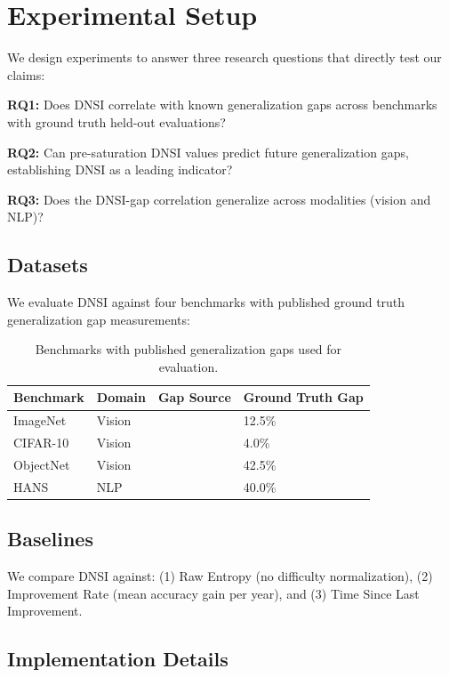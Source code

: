 \section{Experimental Setup}
\label{sec:experiments}

We design experiments to answer three research questions that directly test our claims:

\textbf{RQ1:} Does DNSI correlate with known generalization gaps across benchmarks with ground truth held-out evaluations?

\textbf{RQ2:} Can pre-saturation DNSI values predict future generalization gaps, establishing DNSI as a leading indicator?

\textbf{RQ3:} Does the DNSI-gap correlation generalize across modalities (vision and NLP)?

\subsection{Datasets}

We evaluate DNSI against four benchmarks with published ground truth generalization gap measurements:

\begin{table}[h]
\centering
\caption{Benchmarks with published generalization gaps used for evaluation.}
\label{tab:datasets}
\begin{tabular}{@{}llll@{}}
\toprule
Benchmark & Domain & Gap Source & Ground Truth Gap \\
\midrule
ImageNet & Vision & \citet{recht2019imagenet} & 12.5\% \\
CIFAR-10 & Vision & \citet{recht2019imagenet} & 4.0\% \\
ObjectNet & Vision & \citet{barbu2019objectnet} & 42.5\% \\
HANS & NLP & \citet{mccoy2019right} & 40.0\% \\
\bottomrule
\end{tabular}
\end{table}

\subsection{Baselines}

We compare DNSI against: (1) Raw Entropy (no difficulty normalization), (2) Improvement Rate (mean accuracy gain per year), and (3) Time Since Last Improvement.

\subsection{Implementation Details}

